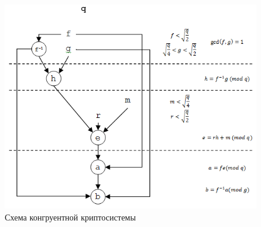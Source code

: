 \begin{figure}[ht]
  \centering
  \includegraphics[scale=0.8]{share/congruental.png}
  \caption{Схема конгруентной криптосистемы}
  \label{fig:congruental}
\end{figure}
